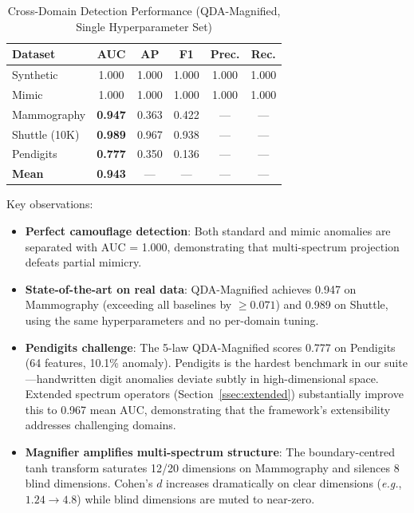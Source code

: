 \documentclass[journal]{IEEEtran}
\newcommand{\eg}{\textit{e.g.}}
\begin{document}
\begin{table}[h]
\centering
\caption{Cross-Domain Detection Performance (QDA-Magnified, Single Hyperparameter Set)}
\label{tab:results}
\begin{tabular}{@{}lccccc@{}}
\toprule
\textbf{Dataset} & \textbf{AUC} & \textbf{AP} & \textbf{F1} & \textbf{Prec.} & \textbf{Rec.} \\
\midrule
Synthetic & 1.000 & 1.000 & 1.000 & 1.000 & 1.000 \\
Mimic & 1.000 & 1.000 & 1.000 & 1.000 & 1.000 \\
Mammography & \textbf{0.947} & 0.363 & 0.422 & --- & --- \\
Shuttle (10K) & \textbf{0.989} & 0.967 & 0.938 & --- & --- \\
Pendigits & \textbf{0.777} & 0.350 & 0.136 & --- & --- \\
\midrule
\textbf{Mean} & \textbf{0.943} & --- & --- & --- & --- \\
\bottomrule
\end{tabular}
\end{table}

Key observations:

\begin{itemize}
  \item \textbf{Perfect camouflage detection}: Both standard and mimic anomalies are separated with AUC = 1.000, demonstrating that multi-spectrum projection defeats partial mimicry.
  \item \textbf{State-of-the-art on real data}: QDA-Magnified achieves 0.947 on Mammography (exceeding all baselines by $\geq 0.071$) and 0.989 on Shuttle, using the same hyperparameters and no per-domain tuning.
  \item \textbf{Pendigits challenge}: The 5-law QDA-Magnified scores 0.777 on Pendigits (64 features, 10.1\% anomaly). Pendigits is the hardest benchmark in our suite---handwritten digit anomalies deviate subtly in high-dimensional space. Extended spectrum operators (Section~\ref{ssec:extended}) substantially improve this to 0.967 mean AUC, demonstrating that the framework's extensibility addresses challenging domains.
  \item \textbf{Magnifier amplifies multi-spectrum structure}: The boundary-centred tanh transform saturates 12/20 dimensions on Mammography and silences 8 blind dimensions. Cohen's $d$ increases dramatically on clear dimensions (\eg, $1.24 \to 4.8$) while blind dimensions are muted to near-zero.
\end{itemize}
\end{document}
